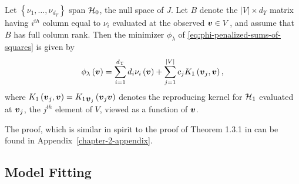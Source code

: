  \begin{theorem} \label{theorem:finite-dimensional-minimizer}
 Let $\left\{\nu_1,\dots, \nu_{d_\Upsilon}\right\}$ span $\mathcal{H}_0$, the null space of $J$. Let $B$ denote the $\vert V \vert \times d_\Upsilon$ matrix having $i^{th}$ column equal to $\nu_i$ evaluated at the observed $\mbox{\boldmath $v$} \in V$, and assume that $B$ has full column rank. Then the minimizer $\phi_\lambda$ of \eqref{eq:phi-penalized-sums-of-squares} is given by
 \begin{equation} \label{eq:form-of-the-minimizer-phi}
\phi_\lambda\left(\mbox{\boldmath $v$}\right) = \sum_{i = 1}^{d_\Upsilon} d_i \nu_{i}\left(\mbox{\boldmath $v$}\right) + \sum_{j = 1}^{\vert V \vert} c_j K_1\left(\mbox{\boldmath $v$}_j, \mbox{\boldmath $v$}\right),
\end{equation}
\noindent
where $K_1\left(\mbox{\boldmath $v$}_j, \mbox{\boldmath $v$} \right) = {K_1}_{\mbox{\boldmath $v$}_j}\left(\mbox{\boldmath $v$}_j \mbox{\boldmath $v$} \right)$ denotes the reproducing kernel for $\mathcal{H}_1$ evaluated at ${\mbox{\boldmath $v$}_j}$, the $j^{th}$ element of $V$, viewed as a function of $\mbox{\boldmath $v$}$.
\end{theorem}
\vspace{0.5cm}
\noindent
The proof, which is similar in spirit to the proof of Theorem 1.3.1 in \cite{wahba1990spline} can be found in Appendix~\ref{chapter-2-appendix}.


\subsection{Model Fitting}

